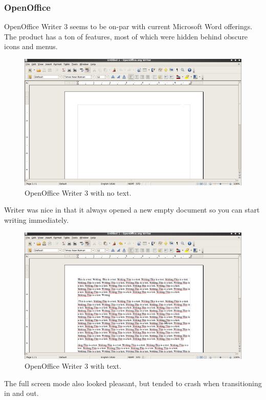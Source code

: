 \documentclass[10pt]{article}
\begin{document}
\subsubsection{OpenOffice}

OpenOffice Writer 3 seems to be on-par with current Microsoft Word offerings. The product has a ton of features, most of which were hidden behind obscure icons and menus.

\begin{figure}
   \centering
      \includegraphics[width=130mm]{images/oo1.png}
   \caption{OpenOffice Writer 3 with no text.}
\end{figure}

Writer was nice in that it always opened a new empty document so you can start writing immediately.

\begin{figure}
   \centering
      \includegraphics[width=130mm]{images/oo2.png}
   \caption{OpenOffice Writer 3 with text.}
\end{figure}

The full screen mode also looked pleasant, but tended to crash when transitioning in and out.
\end{document}
